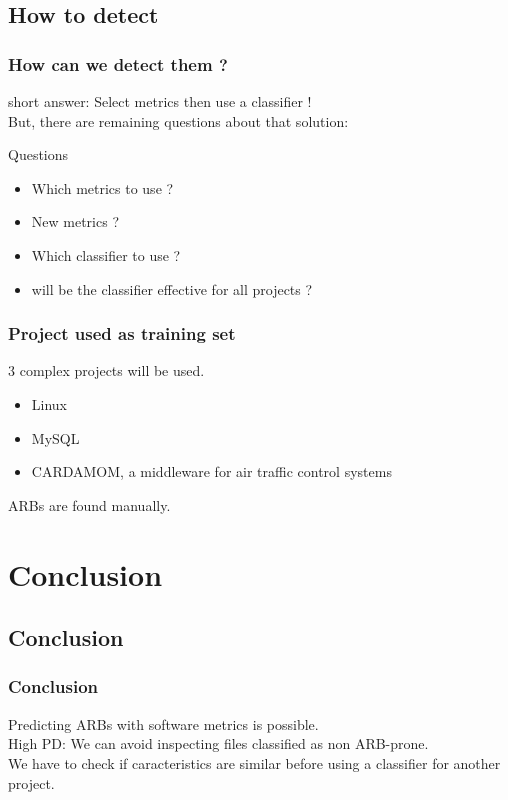 \documentclass[10pt,hyperref={CJKbookmarks=true},xcolor=dvipsnames,aspectratio=169]{beamer}
\begin{document}
\subsection{How to detect}
\begin{frame}
 \frametitle{How can we detect them ?}
 short answer: \alert{Select metrics then use a classifier !}\\
 But, there are remaining questions about that solution:\\
 \begin{block}{Questions}
  \begin{itemize}
   \item Which metrics to use ?
   \item New metrics ?
   \item Which classifier to use ?
   \item will be the classifier effective for all projects ?
  \end{itemize}
 \end{block}
\end{frame}

\begin{frame}
 \frametitle{Project used as training set}
 3 complex projects will be used.\\
 \begin{itemize}
  \item Linux
  \item MySQL
  \item CARDAMOM, a middleware for air traffic control systems
 \end{itemize}
 \vspace{0.2cm}
 ARBs are found manually.\\
\end{frame}









\section{Conclusion}
\subsection{Conclusion}
\begin{frame}
 \frametitle{Conclusion}
 Predicting ARBs with software metrics is possible.\\
 \vspace{1cm}
 High PD: We can avoid inspecting files classified as non ARB-prone.\\
 \vspace{1cm}
 We have to check if caracteristics are similar before using a classifier for another project.
\end{frame}
\end{document}
